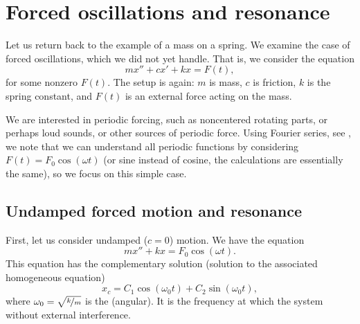 
\sectionnewpage
\section{Forced oscillations and resonance} \label{forcedo:section}



\begin{mywrapfigsimp}{2.0in}{2.3in}
\noindent
{}
\end{mywrapfigsimp}
Let us return back to the example of a mass on a spring.  We examine
the case of forced oscillations, which we did not yet handle.  That is, we consider the equation
\begin{equation*}
mx'' + cx' + kx = F(t) ,
\end{equation*}
for some nonzero $F(t)$.  The setup
is again: $m$ is mass, $c$ is friction, $k$ is the spring constant, and
$F(t)$ is an external force acting on the mass.

We are interested in periodic
forcing, such as noncentered rotating parts, or perhaps loud sounds, or
other sources of periodic force.  Using Fourier series, see
, we
note that we can understand all periodic functions
by considering $F(t) = F_0 \cos (\omega t)$ (or sine instead of cosine,
the calculations are essentially the same), so we focus on this simple case.

\subsection{Undamped forced motion and resonance}

First, let us consider undamped ($c=0$) motion.
We have the equation
\begin{equation*}
mx'' + kx = F_0 \cos (\omega t) .
\end{equation*}
This equation has the complementary solution (solution to the associated homogeneous
equation)
\begin{equation*}
x_c = C_1 \cos (\omega_0 t) + C_2 \sin (\omega_0 t) ,
\end{equation*}
where $\omega_0 = \sqrt{\nicefrac{k}{m}}$ is the
\emph{} (angular).  It is the frequency
at which the system  without external interference.

